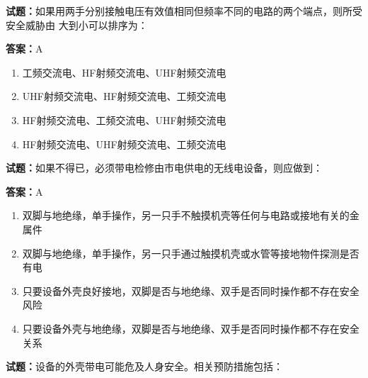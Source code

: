 \documentclass{ctexbook}
\begin{document}
\vspace{1em}

\textbf{试题：}如果用两手分别接触电压有效值相同但频率不同的电路的两个端点，则所受安全威胁由
大到小可以排序为： 

\textbf{答案：}A 

\begin{enumerate}[leftmargin=3em]
  \item 工频交流电、HF射频交流电、UHF射频交流电 

  \item UHF射频交流电、HF射频交流电、工频交流电 

  \item HF射频交流电、工频交流电、UHF射频交流电 

  \item HF射频交流电、UHF射频交流电、工频交流电 

\end{enumerate}





\vspace{1em}

\textbf{试题：}如果不得已，必须带电检修由市电供电的无线电设备，则应做到： 

\textbf{答案：}A 

\begin{enumerate}[leftmargin=3em]
  \item 双脚与地绝缘，单手操作，另一只手不触摸机壳等任何与电路或接地有关的金属件 

  \item 双脚与地绝缘，单手操作，另一只手通过触摸机壳或水管等接地物件探测是否有电 

  \item 只要设备外壳良好接地，双脚是否与地绝缘、双手是否同时操作都不存在安全风险 

  \item 只要设备外壳与地绝缘，双脚是否与地绝缘、双手是否同时操作都不存在安全关系 


\end{enumerate}





\vspace{1em}

\textbf{试题：}设备的外壳带电可能危及人身安全。相关预防措施包括： 
\end{document}
